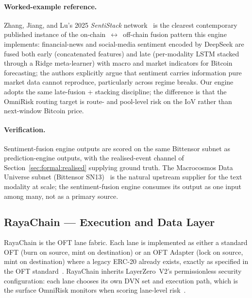\documentclass[11pt,a4paper]{article}
\begin{document}
\paragraph{Worked-example reference.} Zhang, Jiang, and Lu's 2025 \emph{SentiStack}
network~\cite{zhang2025sentistack} is the clearest contemporary published instance of
the on-chain~$\leftrightarrow$~off-chain fusion pattern this engine implements:
financial-news and social-media sentiment encoded by DeepSeek are fused both early
(concatenated features) and late (per-modality LSTM stacked through a Ridge
meta-learner) with macro and market indicators for Bitcoin forecasting; the authors
explicitly argue that sentiment carries information pure market data cannot reproduce,
particularly across regime breaks. Our engine adopts the same late-fusion + stacking
discipline; the difference is that the OmniRisk routing target is route- and pool-level
risk on the IoV rather than next-window Bitcoin price.

\paragraph{Verification.} Sentiment-fusion engine outputs are scored on the same
Bittensor subnet as prediction-engine outputs, with the realised-event channel of
Section~\ref{sec:formal:realised} supplying ground truth. The Macrocosmos Data
Universe subnet (Bittensor SN13)~\cite{macrocosmos2024datauniverse} is the natural
upstream supplier for the text modality at scale; the sentiment-fusion engine consumes
its output as one input among many, not as a primary source.

\subsection{RayaChain --- Execution and Data Layer}\label{sec:arch:rayachain}

RayaChain is the OFT lane fabric. Each lane is implemented as either a standard OFT
(burn on source, mint on destination) or an OFT Adapter (lock on source, mint on
destination) where a legacy ERC-20 already exists, exactly as specified in the OFT
standard~\cite{layerzero2024oft}. RayaChain inherits LayerZero~V2's permissionless
security configuration: each lane chooses its own DVN set and execution path, which is
the surface OmniRisk monitors when scoring lane-level risk~\cite{zarick2024layerzero}.
\end{document}
